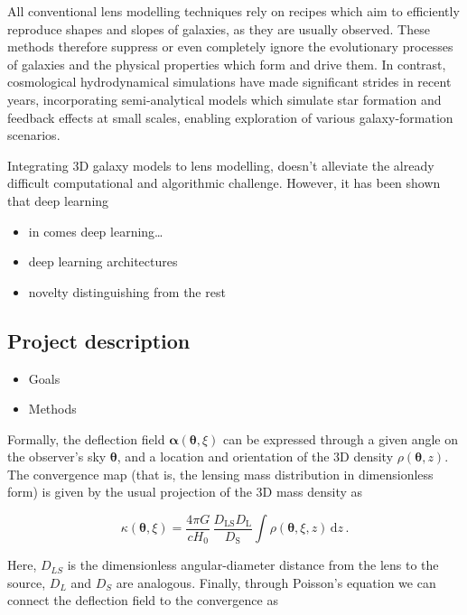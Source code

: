 \documentclass[a4paper,10pt]{article}
\begin{document}
All conventional lens modelling techniques rely on recipes which aim
to efficiently reproduce shapes and slopes of galaxies, as they are
usually observed. These methods therefore suppress or even completely
ignore the evolutionary processes of galaxies and the physical
properties which form and drive them. In contrast, cosmological
hydrodynamical simulations have made significant strides in recent
years, incorporating semi-analytical models which simulate star
formation and feedback effects at small scales, enabling exploration
of various galaxy-formation scenarios.

Integrating 3D galaxy models to lens modelling, doesn't alleviate the
already difficult computational and algorithmic challenge. However, it has been shown that deep learning

\begin{itemize}
\item in comes deep learning\ldots{}
\item deep learning architectures
\item novelty distinguishing from the rest
\end{itemize}


\subsection*{Project description}
\label{sec:org0d5f08b}

\begin{itemize}
\item Goals

\item Methods
\end{itemize}

Formally, the deflection field \(\bm\alpha(\bm\theta, \xi)\) can be
expressed through a given angle on the observer's sky \(\bm\theta\), and
a location and orientation of the 3D density \(\rho(\bm\theta,z)\). The
convergence map (that is, the lensing mass distribution in
dimensionless form) is given by the usual projection of the 3D mass
density as

\begin{equation}
\label{eq:thinlens}
  \kappa(\bm\theta,\xi) = \frac{4\pi G}{cH_0}\, \frac{D_\mathrm{LS}D_\mathrm{L}}{D_\mathrm{S}} \int \rho(\bm\theta,\xi,z)\,\mathrm{d}z \,.
\end{equation}

Here, \(D_{LS}\) is the dimensionless angular-diameter distance from the
lens to the source, \(D_L\) and \(D_S\) are analogous.  Finally, through
Poisson's equation we can connect the deflection field to the convergence as
\end{document}
